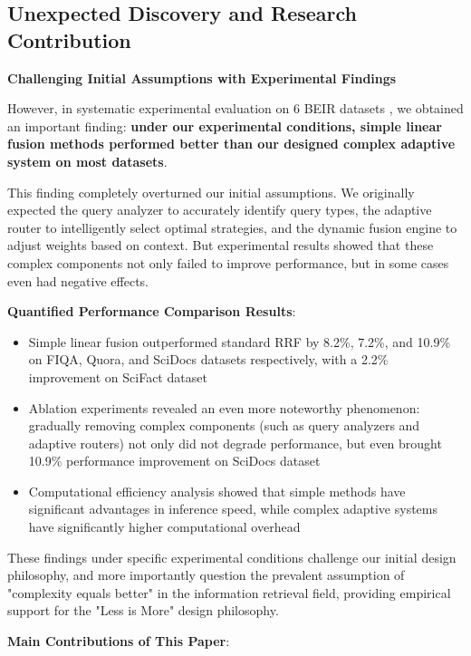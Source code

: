 \documentclass[letterpaper]{article} %
\begin{document}
\subsection{Unexpected Discovery and Research Contribution}

\textbf{Challenging Initial Assumptions with Experimental Findings}

However, in systematic experimental evaluation on 6 BEIR datasets \cite{thakur2021beir}, we obtained an important finding: \textbf{under our experimental conditions, simple linear fusion methods performed better than our designed complex adaptive system on most datasets}.

This finding completely overturned our initial assumptions. We originally expected the query analyzer to accurately identify query types, the adaptive router to intelligently select optimal strategies, and the dynamic fusion engine to adjust weights based on context. But experimental results showed that these complex components not only failed to improve performance, but in some cases even had negative effects.

\textbf{Quantified Performance Comparison Results}:

\begin{itemize}
\item Simple linear fusion outperformed standard RRF by 8.2\%, 7.2\%, and 10.9\% on FIQA, Quora, and SciDocs datasets respectively, with a 2.2\% improvement on SciFact dataset
\item Ablation experiments revealed an even more noteworthy phenomenon: gradually removing complex components (such as query analyzers and adaptive routers) not only did not degrade performance, but even brought 10.9\% performance improvement on SciDocs dataset
\item Computational efficiency analysis showed that simple methods have significant advantages in inference speed, while complex adaptive systems have significantly higher computational overhead
\end{itemize}

These findings under specific experimental conditions challenge our initial design philosophy, and more importantly question the prevalent assumption of "complexity equals better" in the information retrieval field, providing empirical support for the "Less is More" design philosophy.

\textbf{Main Contributions of This Paper}:
\end{document}
